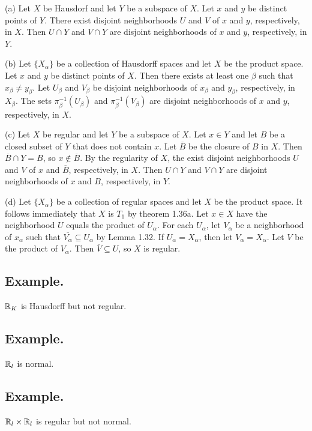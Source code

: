 \documentclass[titlepage]{article}
\begin{document}
(a) Let $X$ be Hausdorf and let $Y$ be a subspace of $X$. Let $x$ and $y$ be distinct points of $Y$. There exist disjoint neighborhoods $U$ and $V$ of $x$ and $y$, respectively, in $X$. Then $U \cap Y$ and $V \cap Y$ are disjoint neighborhoods of $x$ and $y$, respectively, in $Y$.

(b) Let $\{X_{\alpha}\}$ be a collection of Hausdorff spaces and let $X$ be the product space. Let $x$ and $y$ be distinct points of $X$. Then there exists at least one $\beta$ such that $x_{\beta} \neq y_{\beta}$. Let $U_{\beta}$ and $V_{\beta}$ be disjoint neighborhoods of $x_{\beta}$ and $y_{\beta}$, respectively, in $X_{\beta}$. The sets $\pi_{\beta}^{-1}(U_{\beta})$ and $\pi_{\beta}^{-1}(V_{\beta})$ are disjoint neighborhoods of $x$ and $y$, respectively, in $X$.

(c) Let $X$ be regular and let $Y$ be a subspace of $X$. Let $x \in Y$ and let $B$ be a closed subset of $Y$ that does not contain $x$. Let $\overline{B}$ be the closure of $B$ in $X$. Then $\overline{B} \cap Y = B$, so $x \not\in \overline{B}$. By the regularity of $X$, the exist disjoint neighborhoods $U$ and $V$ of $x$ and $\overline{B}$, respectively, in $X$. Then $U \cap Y$ and $V \cap Y$ are disjoint neighborhoods of $x$ and $B$, respectively, in $Y$.

(d) Let $\{X_{\alpha}\}$ be a collection of regular spaces and let $X$ be the product space. It follows immediately that $X$ is $T_{1}$ by theorem 1.36a. Let $x \in X$ have the neighborhood $U$ equals the product of $U_{\alpha}$. For each $U_{\alpha}$, let $V_{\alpha}$ be a neighborhood of $x_{\alpha}$ such that $\overline{V_{\alpha}} \subseteq U_{\alpha}$ by Lemma 1.32. If $U_{\alpha} = X_{\alpha}$, then let $V_{\alpha} = X_{\alpha}$. Let $V$ be the product of $V_{\alpha}$. Then $\overline{V} \subseteq U$, so $X$ is regular.

\subsection{Example.} $\mathbb{R}_{K}$ is Hausdorff but not regular.

\subsection{Example.} $\mathbb{R}_{l}$ is normal.

\subsection{Example.} $\mathbb{R}_{l} \times \mathbb{R}_{l}$ is regular but not normal.
\end{document}
